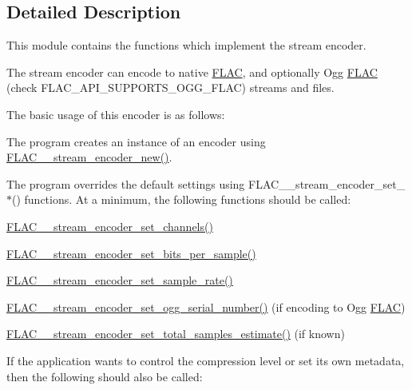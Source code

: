 \subsection{Detailed Description}
This module contains the functions which implement the stream encoder. 

The stream encoder can encode to native \hyperlink{namespace_f_l_a_c}{F\+L\+AC}, and optionally Ogg \hyperlink{namespace_f_l_a_c}{F\+L\+AC} (check F\+L\+A\+C\+\_\+\+A\+P\+I\+\_\+\+S\+U\+P\+P\+O\+R\+T\+S\+\_\+\+O\+G\+G\+\_\+\+F\+L\+AC) streams and files.

The basic usage of this encoder is as follows\+:
\begin{DoxyItemize}
\item The program creates an instance of an encoder using \hyperlink{group__flac__stream__encoder_ga35f3d94452bcf0a90a31c7d770b200bc}{F\+L\+A\+C\+\_\+\+\_\+stream\+\_\+encoder\+\_\+new()}.
\item The program overrides the default settings using F\+L\+A\+C\+\_\+\+\_\+stream\+\_\+encoder\+\_\+set\+\_\+$\ast$() functions. At a minimum, the following functions should be called\+:
\begin{DoxyItemize}
\item \hyperlink{group__flac__stream__encoder_gabfc9c883c124a849b5b42a87c30e10a5}{F\+L\+A\+C\+\_\+\+\_\+stream\+\_\+encoder\+\_\+set\+\_\+channels()}
\item \hyperlink{group__flac__stream__encoder_ga5a21cf7f86a81df6ba72714a6b917aa3}{F\+L\+A\+C\+\_\+\+\_\+stream\+\_\+encoder\+\_\+set\+\_\+bits\+\_\+per\+\_\+sample()}
\item \hyperlink{group__flac__stream__encoder_ga108c3f4fbdcaa744ddbb125f91cb3838}{F\+L\+A\+C\+\_\+\+\_\+stream\+\_\+encoder\+\_\+set\+\_\+sample\+\_\+rate()}
\item \hyperlink{group__flac__stream__encoder_ga646c9800d42620a6c504fbdfbd092666}{F\+L\+A\+C\+\_\+\+\_\+stream\+\_\+encoder\+\_\+set\+\_\+ogg\+\_\+serial\+\_\+number()} (if encoding to Ogg \hyperlink{namespace_f_l_a_c}{F\+L\+AC})
\item \hyperlink{group__flac__stream__encoder_ga0d3f45052f2f7379c73e2b027c7f956c}{F\+L\+A\+C\+\_\+\+\_\+stream\+\_\+encoder\+\_\+set\+\_\+total\+\_\+samples\+\_\+estimate()} (if known)
\end{DoxyItemize}
\item If the application wants to control the compression level or set its own metadata, then the following should also be called\+:
\begin{DoxyItemize}

\end{DoxyItemize}
\end{DoxyItemize}
